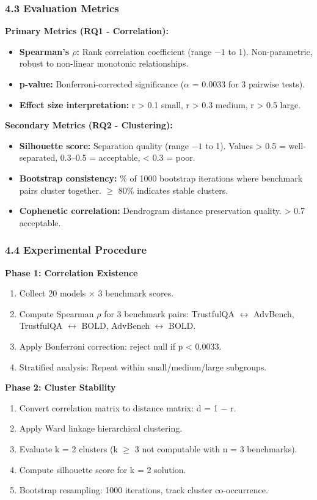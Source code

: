 \subsubsection{4.3 Evaluation Metrics}

\textbf{Primary Metrics (RQ1 - Correlation):}
\begin{itemize}
\item \textbf{Spearman's $\rho$:} Rank correlation coefficient (range $-1$ to 1). Non-parametric, robust to non-linear monotonic relationships.
\item \textbf{p-value:} Bonferroni-corrected significance ($\alpha$ = 0.0033 for 3 pairwise tests).
\item \textbf{Effect size interpretation:} r > 0.1 small, r > 0.3 medium, r > 0.5 large.
\end{itemize}

\textbf{Secondary Metrics (RQ2 - Clustering):}
\begin{itemize}
\item \textbf{Silhouette score:} Separation quality (range $-1$ to 1). Values > 0.5 = well-separated, 0.3--0.5 = acceptable, < 0.3 = poor.
\item \textbf{Bootstrap consistency:} \% of 1000 bootstrap iterations where benchmark pairs cluster together. $\geq$ 80\% indicates stable clusters.
\item \textbf{Cophenetic correlation:} Dendrogram distance preservation quality. > 0.7 acceptable.
\end{itemize}

\subsubsection{4.4 Experimental Procedure}

\textbf{Phase 1: Correlation Existence}
\begin{enumerate}
\item Collect 20 models $\times$ 3 benchmark scores.
\item Compute Spearman $\rho$ for 3 benchmark pairs: TrustfulQA $\leftrightarrow$ AdvBench, TrustfulQA $\leftrightarrow$ BOLD, AdvBench $\leftrightarrow$ BOLD.
\item Apply Bonferroni correction: reject null if p < 0.0033.
\item Stratified analysis: Repeat within small/medium/large subgroups.
\end{enumerate}

\textbf{Phase 2: Cluster Stability}
\begin{enumerate}
\item Convert correlation matrix to distance matrix: d = 1 $-$ r.
\item Apply Ward linkage hierarchical clustering.
\item Evaluate k = 2 clusters (k $\geq$ 3 not computable with n = 3 benchmarks).
\item Compute silhouette score for k = 2 solution.
\item Bootstrap resampling: 1000 iterations, track cluster co-occurrence.
\end{enumerate}

